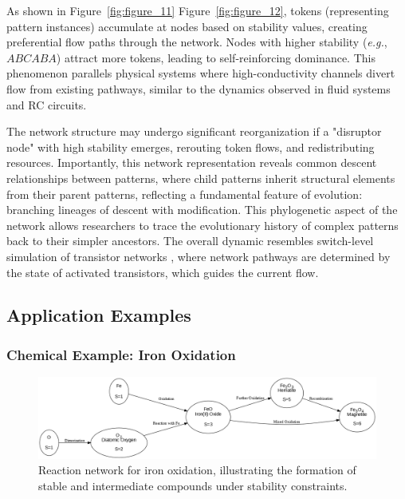 \documentclass[preprint,12pt]{elsarticle}
\begin{document}
As shown in Figure~\ref{fig:figure_11} Figure~\ref{fig:figure_12}, tokens (representing pattern instances) accumulate at nodes based on stability values, creating preferential flow paths through the network. Nodes with higher stability (\textit{e.g.}, $ABCABA$) attract more tokens, leading to self-reinforcing dominance. This phenomenon parallels physical systems where high-conductivity channels divert flow from existing pathways, similar to the dynamics observed in fluid systems and RC circuits.

The network structure may undergo significant reorganization if a "disruptor node" with high stability emerges, rerouting token flows, and redistributing resources. Importantly, this network representation reveals common descent relationships between patterns, where child patterns inherit structural elements from their parent patterns, reflecting a fundamental feature of evolution: branching lineages of descent with modification. This phylogenetic aspect of the network allows researchers to trace the evolutionary history of complex patterns back to their simpler ancestors. The overall dynamic resembles switch-level simulation of transistor networks \cite{AdlerCAD}, where network pathways are determined by the state of activated transistors, which guides the current flow.


\subsection{Application Examples}



\subsubsection{Chemical Example: Iron Oxidation}

\begin{figure}[h]
    \centering
    \includegraphics[width=1\textwidth,height=0.3\textwidth]{figure_13.png}
    \caption{Reaction network for iron oxidation, illustrating the formation of stable and intermediate compounds under stability constraints.}
    \label{fig:figure_13}
\end{figure}
\end{document}
